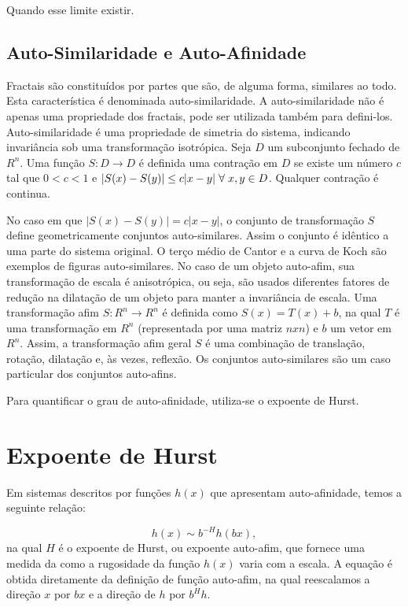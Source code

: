 \documentclass[brazil,ruledheader]{abnt}
\begin{document}
Quando esse limite existir.

\subsection{Auto-Similaridade e Auto-Afinidade}

Fractais são constituídos por partes que são, de alguma forma, similares
ao todo. Esta característica é denominada auto-similaridade. A
auto-similaridade não é apenas uma propriedade dos fractais, pode ser utilizada
também para defini-los. Auto-similaridade é uma propriedade de simetria do
sistema, indicando invariância sob uma transformação isotrópica. Seja $D$ um
subconjunto fechado de $R^n$. Uma função $S:D\rightarrow D$ é definida uma
contração em $D$ se existe um número $c$ tal que $0<c<1$ e
$|S(x)-S(y)|\leq c|x-y| \mbox{\hspace{.3em}} \forall \mbox{\hspace{.3em}} x, y
\in D$. Qualquer contração é continua. 

No caso em que $|S(x)-S(y)|=c|x-y|$, o conjunto de transformação $S$ define
geometricamente conjuntos auto-similares.  Assim o conjunto é idêntico a uma
parte do
sistema original.  O terço médio de Cantor e a curva de Koch são exemplos de
figuras auto-similares. No caso de um objeto auto-afim, sua transformação de
escala é anisotrópica, ou seja, são usados diferentes fatores de redução na
dilatação de um objeto para manter a invariância de escala. Uma transformação
afim $S:R^n \rightarrow R^n$ é definida como $S(x)=T(x)+b$, na qual $T$ é uma
transformação em $R^n$ (representada por uma matriz $nxn$) e $b$ um vetor em
$R^n$. Assim, a transformação afim geral $S$ é uma combinação de translação,
rotação, dilatação e, às vezes, reflexão. Os conjuntos auto-similares são um
caso particular dos conjuntos auto-afins.

Para quantificar o grau de auto-afinidade, utiliza-se o expoente de Hurst.

\section{Expoente de Hurst}

Em sistemas descritos por funções $h(x)$ que apresentam auto-afinidade, temos a
seguinte relação:

\begin{equation}
\label{eq:rugosidade-hx}
h(x) \sim b^{-H}h(bx),
\end{equation}
na qual $H$ é o expoente de Hurst,  ou expoente auto-afim, que fornece uma
medida da como a rugosidade da função $h(x)$ varia com a escala. A equação é
obtida diretamente da definição de função auto-afim, na qual reescalamos a
direção $x$ por $bx$ e a direção de $h$ por $b^Hh$.
\end{document}
